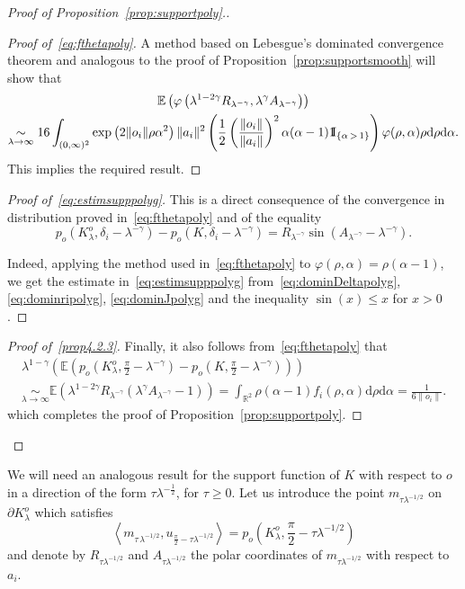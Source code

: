 \documentclass[AHL,Unicode,longabstracts,published]{cedram}
\newcommand{\indicat}{{\text{1}}\negthickspace\text{I}}
\newcommand{\dd}{\mathrm{d}}
\newcommand{\E}{\mathbb{E}}
\newcommand{\R}{\mathbb{R}}
\newcommand{\pass}{\vspace{0.3cm}\noindent}
\newcommand{\noi}{\noindent}
\newenvironment*{prooff}{\begin{proof}}{\let\qed\relax\end{proof}}
\newenvironment*{lastprooff}{\begin{proof}}{\end{proof}}
\newcommand{\R}{\mathbb{R}}
\begin{document}
\begin{proof}[{Proof of Proposition~\ref{prop:supportpoly}.}]
\begin{prooff}[{Proof of~\eqref{eq:fthetapoly}}]
A method based on Lebesgue's dominated convergence theorem and analogous to the proof of Proposition~\ref{prop:supportsmooth} will show that
\begin{multline*}
\E\left(\varphi\left(\lambda^{1-2\gamma}R_{\lambda^{-\gamma}}, \lambda^{\gamma}A_{\lambda^{-\gamma}}\right)\right)\\
\underset{\lambda\to\infty}{\sim} 16\int_{(0,\infty)^2}\exp\left(2\|o_i\|\rho\alpha^2\right)\|a_i\|^2\left(\frac1{2}\left(\frac{\|o_i\|}{\|a_i\|}\right)^2\alpha(\alpha-1)\indicat_{\left\{\alpha\,>\,1\right\}}\right)
\varphi(\rho,\alpha)\rho\dd \rho \dd\alpha.
\end{multline*}
This implies the required result.
\end{prooff}

\begin{prooff}[{Proof of~\eqref{eq:estimsupppolyg}}]
This is a direct consequence of the convergence in distribution proved in~\eqref{eq:fthetapoly} and of the equality
\[
p_o\left(K_{\lambda}^o,\delta_i -\lambda^{-\gamma}\right)-p_o\left(K,\delta_i-\lambda^{-\gamma}\right)=R_{\lambda^{-\gamma}}\sin\left(A_{\lambda^{-\gamma}}-\lambda^{-\gamma}\right).
\]

Indeed, applying the method used in~\eqref{eq:fthetapoly} to $\varphi(\rho,\alpha)=\rho(\alpha-1)$, we get the estimate in~\eqref{eq:estimsupppolyg} from~\eqref{eq:dominDeltapolyg}, \eqref{eq:dominripolyg}, \eqref{eq:dominJpolyg} and the inequality $\sin(x)\le x$ for $x>0$.
\end{prooff}

\begin{lastprooff}[{Proof of~\eqref{prop4.2.3}}]
Finally, it also follows from~\eqref{eq:fthetapoly} that
\begin{multline*}
\lambda^{1-\gamma}\left(\E\left(p_o\left(K_{\lambda}^o,\frac{\pi}{2} -\lambda^{-\gamma}\right)-p_o\left(K,\frac{\pi}{2}-\lambda^{-\gamma}\right)\right)\right)\\
\underset{\lambda\to\infty}{\sim} \E\left(\lambda^{1-2\gamma}R_{\lambda^{-\gamma}}\left(\lambda^{\gamma}A_{\lambda^{-\gamma}}-1\right)\right) 
= \int_{\R^2} \rho(\alpha-1) f_i(\rho,\alpha)\dd \rho\dd \alpha = \frac1{6\|o_i\|}.
\end{multline*}
which completes the proof of Proposition~\ref{prop:supportpoly}.
\end{lastprooff}\let\qed\relax
\end{proof}
We will need an analogous result for the support function of $K$ with respect to $o$ in a direction of the form $\tau\lambda^{-\frac1{2}}$, for $\tau\ge0$. Let us introduce the point $m_{\tau\lambda^{-1/2}}$ on $\partial K_{\lambda}^o$ which satisfies
\[
\left\langle m_{\tau\,\lambda^{-1/2}}, u_{\frac{\pi}{2}-\tau\lambda^{-1/2}}\right\rangle=p_o\left(K_{\lambda}^o,\frac{\pi}{2}-\tau\lambda^{-1/2}\right)
\]
and denote by $R_{\tau\lambda^{-1/2}}$ and $A_{\tau\lambda^{-1/2}}$ the polar coordinates of $m_{\tau\lambda^{-1/2}}$ with respect to $a_i$.
\end{document}
